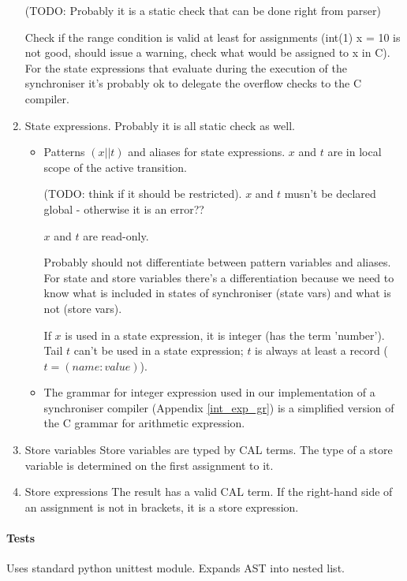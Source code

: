 \begin{enumerate}
(TODO: Probably it is a static check that can be done right from parser)

Check if the range condition is valid at least for assignments (int(1) x = 10 is not good, should issue a warning, check what would be assigned to x in C). For the state expressions that evaluate during the execution of the synchroniser it's probably ok to delegate the overflow checks to the C compiler.

\item State expressions. Probably it is all static check as well.
  \begin{itemize}
  \item Patterns $(x || t)$ and aliases for state expressions. $x$ and $t$ are in local scope of the active transition.

(TODO: think if it should be restricted). $x$ and $t$ musn't be declared global - otherwise it is an error??

$x$ and $t$ are read-only.

Probably should not differentiate between pattern variables and aliases. For state and store variables there's a differentiation because we need to know what is included in states of synchroniser (state vars) and what is not (store vars).

If $x$ is used in a state expression, it is integer (has the term 'number'). Tail $t$ can't be used in a state expression; $t$ is always at least a record ($t = (name: value)$).

  \item The grammar for integer expression used in our implementation of a synchroniser compiler (Appendix \ref{int_exp_gr}) is a simplified version of the C grammar for arithmetic expression.

  \end{itemize}


\item Store variables
Store variables are typed by CAL terms.
The type of a store variable is determined on the first assignment to it.

\item Store expressions
The result has a valid CAL term.
If the right-hand side of an assignment is not in brackets, it is a store expression.

\end{enumerate}

    \paragraph{Tests}
Uses standard python unittest module.
Expands AST into nested list.


